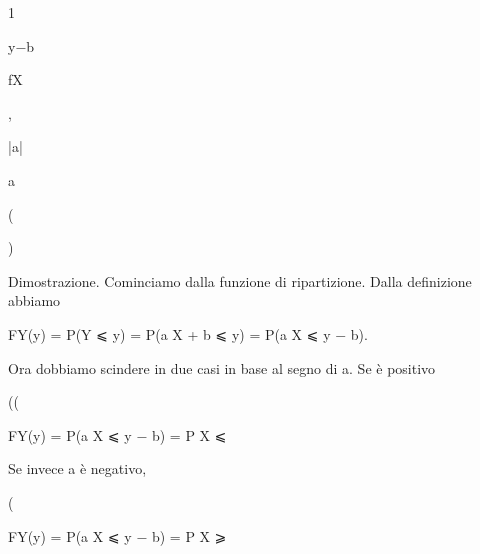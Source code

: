 \documentclass[a4paper,portrait,12pt]{article}
\begin{document}
1


\begin{flushleft}
y$-$b
\end{flushleft}


\begin{flushleft}
fX
\end{flushleft}


,


\begin{flushleft}
|a|
\end{flushleft}


\begin{flushleft}
a
\end{flushleft}





(





)





\begin{flushleft}
Dimostrazione. Cominciamo dalla funzione di ripartizione. Dalla definizione abbiamo
\end{flushleft}


\begin{flushleft}
FY(y) = P(Y ⩽ y) = P(a X + b ⩽ y) = P(a X ⩽ y $-$ b).
\end{flushleft}


\begin{flushleft}
Ora dobbiamo scindere in due casi in base al segno di a. Se \`{e} positivo
\end{flushleft}





((





\begin{flushleft}
FY(y) = P(a X ⩽ y $-$ b) = P X ⩽
\end{flushleft}


\begin{flushleft}
Se invece a \`{e} negativo,
\end{flushleft}





(





\begin{flushleft}
FY(y) = P(a X ⩽ y $-$ b) = P X ⩾
\end{flushleft}
\end{document}
